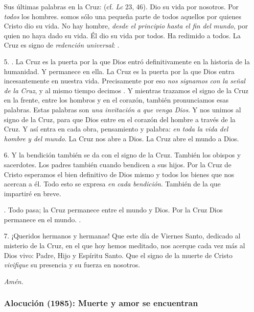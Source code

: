 \begin{body}
Sus últimas palabras en la Cruz:  (cf. \textit{Lc} 23, 46). Dio su vida por nosotros. Por \textit{todos} los hombres.  somos sólo una pequeña parte de todos aquellos por quienes Cristo dio su vida. No hay hombre, \textit{desde el principio hasta el fin del mundo}, por quien no haya dado su vida. Él dio su vida por todos. Ha redimido a todos. La Cruz es signo de \textit{redención universal}: . 

5. . La Cruz es la puerta por la que Dios entró definitivamente en la historia de la humanidad. Y permanece en ella. La Cruz es la puerta por la que Dios entra incesantemente en nuestra vida. Precisamente por eso \textit{nos signamos con la señal de la Cruz}, y al mismo tiempo decimos . Y mientras trazamos el signo de la Cruz en la frente, entre los hombros y en el corazón, también pronunciamos esas palabras. Estas palabras son \textit{una invitación a que venga Dios}. Y nos unimos al signo de la Cruz, para que Dios entre en el corazón del hombre a través de la Cruz. Y así entra en cada obra, pensamiento y palabra: \textit{en toda la vida del hombre y del mundo}. La Cruz nos abre a Dios. La Cruz abre el mundo a Dios. 

6. Y la bendición también se da con el signo de la Cruz. También los obispos y sacerdotes. Los padres también cuando bendicen a sus hijos. Por la Cruz de Cristo esperamos el bien definitivo de Dios mismo y todos los bienes que nos acercan a él. Todo esto se expresa \textit{en cada bendición}. También de la que impartiré en breve. 

. Todo pasa; la Cruz permanece entre el mundo y Dios. Por la Cruz Dios permanece en el mundo. . 

7. ¡Queridos hermanos y hermanas! Que este día de Viernes Santo, dedicado al misterio de la Cruz, en el que hoy hemos meditado, nos acerque cada vez más al Dios vivo: Padre, Hijo y Espíritu Santo. Que el signo de la muerte de Cristo \textit{vivifique} su presencia y su fuerza en nosotros. 

\textit{Amén.}
\end{body}

\newpage 
\subsubsection{Alocución (1985): Muerte y amor se encuentran}

